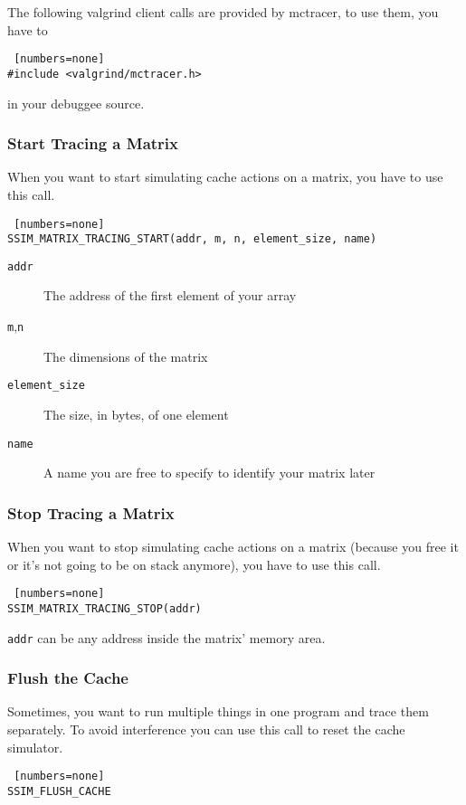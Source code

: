 \lstset{language=C}

The following valgrind client calls are provided by mctracer, to use them, you have to
\begin{lstlisting} [numbers=none]
#include <valgrind/mctracer.h>
\end{lstlisting}
in your debuggee source.

\subsubsection{Start Tracing a Matrix}
When you want to start simulating cache actions on a matrix, you have to use this call.
\begin{lstlisting} [numbers=none]
SSIM_MATRIX_TRACING_START(addr, m, n, element_size, name)
\end{lstlisting}
\begin{description}
\item[\texttt{addr}] The address of the first element of your array
\item[\texttt{m},\texttt{n}] The dimensions of the matrix
\item[\texttt{element\_size}] The size, in bytes, of one element
\item[\texttt{name}] A name you are free to specify to identify your matrix later
\end{description}


\subsubsection{Stop Tracing a Matrix}
When you want to stop simulating cache actions on a matrix (because you free it or it's not going to be on stack anymore), you have to use this call.
\begin{lstlisting} [numbers=none]
SSIM_MATRIX_TRACING_STOP(addr)
\end{lstlisting}
\texttt{addr} can be any address inside the matrix' memory area.

\subsubsection{Flush the Cache}
Sometimes, you want to run multiple things in one program and trace them separately. To avoid interference you can use this call to reset the cache simulator.
\begin{lstlisting} [numbers=none]
SSIM_FLUSH_CACHE
\end{lstlisting}

